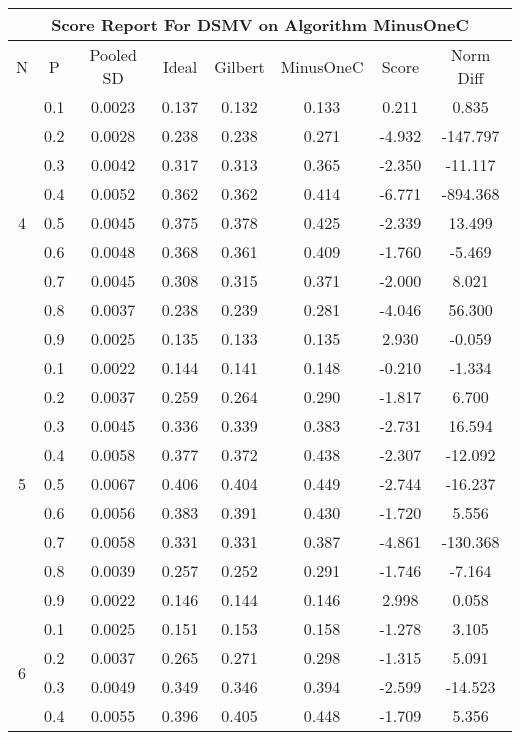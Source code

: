 \documentclass[11pt,a4paper]{report}
\begin{document}
\begin{longtable}{ | c | c || c | c | c | c | c | c | }
\hline
\multicolumn{8}{|c|}{ Score Report For DSMV on Algorithm MinusOneC} \\
\hline
N & P & Pooled SD &  Ideal &  Gilbert & MinusOneC  & Score & Norm Diff \\
 \hline
 \hline
 \endhead
\multirow{9}{*}{4} & 0.1 & 0.0023 & 0.137 & 0.132 & 0.133 & 0.211 & 0.835 \\
 & 0.2 & 0.0028 & 0.238 & 0.238 & 0.271 & -4.932 & -147.797 \\
 & 0.3 & 0.0042 & 0.317 & 0.313 & 0.365 & -2.350 & -11.117 \\
 & 0.4 & 0.0052 & 0.362 & 0.362 & 0.414 & -6.771 & -894.368 \\
 & 0.5 & 0.0045 & 0.375 & 0.378 & 0.425 & -2.339 & 13.499 \\
 & 0.6 & 0.0048 & 0.368 & 0.361 & 0.409 & -1.760 & -5.469 \\
 & 0.7 & 0.0045 & 0.308 & 0.315 & 0.371 & -2.000 & 8.021 \\
 & 0.8 & 0.0037 & 0.238 & 0.239 & 0.281 & -4.046 & 56.300 \\
 & 0.9 & 0.0025 & 0.135 & 0.133 & 0.135 & 2.930 & -0.059 \\
 \hline
\multirow{9}{*}{5} & 0.1 & 0.0022 & 0.144 & 0.141 & 0.148 & -0.210 & -1.334 \\
 & 0.2 & 0.0037 & 0.259 & 0.264 & 0.290 & -1.817 & 6.700 \\
 & 0.3 & 0.0045 & 0.336 & 0.339 & 0.383 & -2.731 & 16.594 \\
 & 0.4 & 0.0058 & 0.377 & 0.372 & 0.438 & -2.307 & -12.092 \\
 & 0.5 & 0.0067 & 0.406 & 0.404 & 0.449 & -2.744 & -16.237 \\
 & 0.6 & 0.0056 & 0.383 & 0.391 & 0.430 & -1.720 & 5.556 \\
 & 0.7 & 0.0058 & 0.331 & 0.331 & 0.387 & -4.861 & -130.368 \\
 & 0.8 & 0.0039 & 0.257 & 0.252 & 0.291 & -1.746 & -7.164 \\
 & 0.9 & 0.0022 & 0.146 & 0.144 & 0.146 & 2.998 & 0.058 \\
 \hline
\multirow{9}{*}{6} & 0.1 & 0.0025 & 0.151 & 0.153 & 0.158 & -1.278 & 3.105 \\
 & 0.2 & 0.0037 & 0.265 & 0.271 & 0.298 & -1.315 & 5.091 \\
 & 0.3 & 0.0049 & 0.349 & 0.346 & 0.394 & -2.599 & -14.523 \\
 & 0.4 & 0.0055 & 0.396 & 0.405 & 0.448 & -1.709 & 5.356 \\

\end{longtable}
\end{document}
